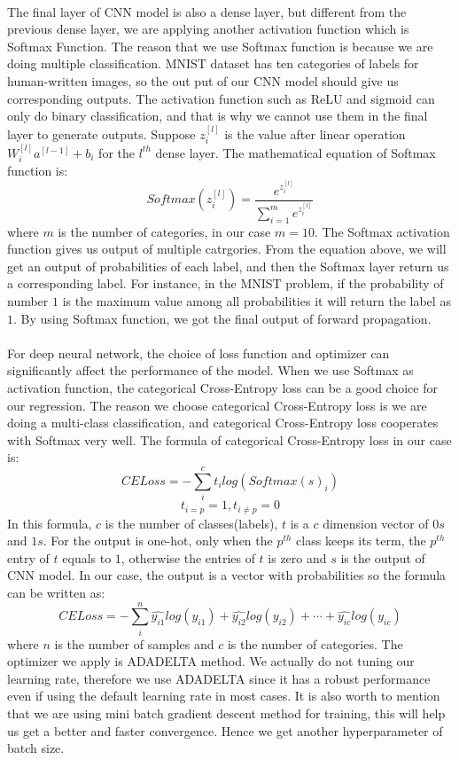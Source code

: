 \documentclass[12pt]{article}
\begin{document}
~\\
The final layer of CNN model is also a dense layer, but different from the previous dense layer, we are applying another activation function which is Softmax Function. The reason that we use Softmax function is because we are doing multiple classification. MNIST dataset has ten categories of labels for human-written images, so the out put of our CNN model should give us corresponding outputs. The activation function such as ReLU and sigmoid can only do binary classification, and that is why we cannot use them in the final layer to generate outputs. Suppose $z^{[l]}_i$ is the value after linear operation $W^{[l]}_i a^{[l-1]} + b_i$ for the $l^{th}$ dense layer. The mathematical equation of Softmax function is:
$$Softmax(z^{[l]}_i) = \frac{e^{z^{[l]}_i}}{\displaystyle \sum_{i=1}^me^{z^{[l]}_i}}$$
where $m$ is the number of categories, in our case $m=10$. The Softmax activation function gives us output of multiple catrgories. From the equation above, we will get an output of probabilities of each label, and then the Softmax layer return us a corresponding label. For instance, in the MNIST problem, if the probability of number $1$ is the maximum value among all probabilities it will return the label as $1$. By using Softmax function, we got the final output of forward propagation. \\
~\\
For deep neural network, the choice of loss function and optimizer can significantly affect the performance of the model. When we use Softmax as activation function, the categorical Cross-Entropy loss can be a good choice for
our regression. The reason we choose categorical Cross-Entropy loss is we are doing a multi-class classification, and categorical Cross-Entropy loss cooperates with Softmax very well. The formula of categorical Cross-Entropy loss in our case is:
$$CELoss = -\displaystyle\sum_i^ct_ilog(Softmax(s)_i)$$
$$t_{i=p} = 1, t_{i \neq p} = 0$$
In this formula, $c$ is the number of classes(labels), $t$ is a $c$ dimension vector of $0s$ and $1s$. For the output is  one-hot, only when the $p^{th}$ class keeps its term, the $p^{th}$ entry of $t$ equals to $1$, otherwise the entries of $t$ is zero and $s$ is the output of CNN model. In our case, the output is a vector with probabilities so the formula can be written as:
$$CELoss = -\displaystyle\sum_i^n \hat{y_{i1}}log(y_{i1})+\hat{y_{i2}}log(y_{i2})+\cdots+\hat{y_{ic}}log(y_{ic})$$
where $n$ is the number of samples and $c$ is the number of categories. The optimizer we apply is ADADELTA method. We actually do not tuning our learning rate, therefore we use ADADELTA since it has a robust performance even if using the default learning rate in most cases. It is also worth to mention that we are using mini batch gradient descent method for training, this will help us get a better and faster convergence. Hence we get another hyperparameter of batch size.\\
\end{document}
